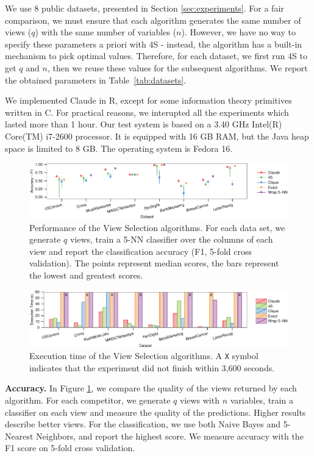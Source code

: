 We use 8 public datasets, presented in Section \ref{sec:experiments}. For a fair
comparison, we must ensure that each algorithm generates the same number of
views ($q$) with the same number of variables ($n$).  However, we have no
way to specify these parameters a priori with 4S - instead, the algorithm has a
built-in mechanism to pick optimal values. Therefore, for each dataset, we
first run 4S to get $q$ and $n$, then we reuse these values for the subsequent
algorithms. We report the obtained parameters in Table~\ref{tab:datasets}.

We implemented Claude in R, except for some information theory primitives
written in C. For practical reasons, we interupted all the experiments which
lasted more than 1 hour. Our test system is based on a 3.40 GHz Intel(R)
Core(TM) i7-2600 processor. It is equipped with 16 GB RAM, but the Java heap
space is limited to 8 GB. The operating system is Fedora 16. 

\begin{figure}[t!]
\centering
\includegraphics[width=2\columnwidth]{plots/view-scores}
\caption{Performance of the View Selection algorithms. For each data set, we
    generate $q$ views, train a 5-NN classifier over the columns of each view
    and report the classification accuracy (F1, 5-fold cross validation). The
    points represent median scores, the bars represent the lowest and greatest
    scores.} 
\label{pic:column-select-score}
\end{figure}
\begin{figure}[t!]
\centering
\includegraphics[width=2\columnwidth]{plots/view-times}
\caption{Execution time of the View Selection algorithms. A \texttt{X} symbol
indicates that the experiment did not finish within 3,600 seconds.}
\label{pic:column-select-time}
\end{figure}

\textbf{Accuracy.} In Figure \ref{pic:column-select-score}, we compare the
quality of the views returned by each algorithm. For each competitor, we
generate $q$ views with $n$ variables, train a classifier on each view and
measure the quality of the predictions. Higher results describe better views.
For the classification, we use both Naive Bayes and 5-Nearest Neighbors, and
report the highest score.  We measure accuracy with the F1 score on 5-fold
cross validation.  

